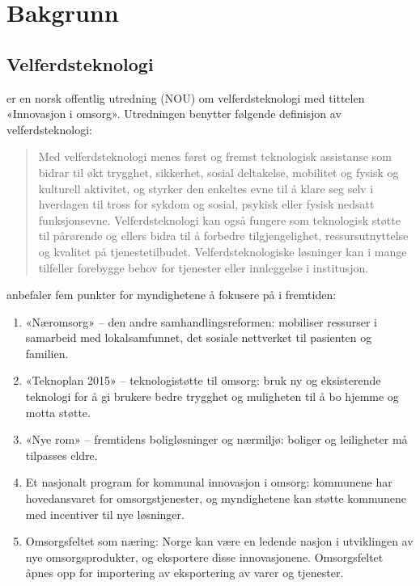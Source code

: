\chapter{Bakgrunn}
\label{ch:background}

\section{Velferdsteknologi}
\citet{regjeringen_hagen} er en norsk offentlig utredning (NOU) om velferdsteknologi med tittelen «Innovasjon i omsorg».
Utredningen benytter følgende definisjon av velferdsteknologi:

\blockquote{
Med velferdsteknologi menes først og fremst
teknologisk assistanse som bidrar til økt trygghet,
sikkerhet, sosial deltakelse, mobilitet og
fysisk og kulturell aktivitet, og styrker den
enkeltes evne til å klare seg selv i hverdagen til
tross for sykdom og sosial, psykisk eller fysisk
nedsatt funksjonsevne. Velferdsteknologi kan
også fungere som teknologisk støtte til pårørende og
ellers bidra til å forbedre tilgjengelighet,
ressursutnyttelse og kvalitet på tjenestetilbudet.
Velferdsteknologiske løsninger kan i
mange tilfeller forebygge behov for tjenester
eller innleggelse i institusjon.
}

\citet{regjeringen_hagen} anbefaler fem punkter for myndighetene å fokusere på i fremtiden:

\begin{enumerate}
    \item «Næromsorg» -- den andre samhandlingsreformen: mobiliser ressurser i samarbeid med
    lokalsamfunnet, det sosiale nettverket til pasienten og familien.
    \item «Teknoplan 2015» -- teknologistøtte til omsorg: bruk ny og eksisterende teknologi for å gi brukere
    bedre trygghet og muligheten til å bo hjemme og motta støtte.
    \item «Nye rom» -- fremtidens boligløsninger og nærmiljø: boliger og leiligheter må tilpasses eldre.
    \item Et nasjonalt program for kommunal innovasjon i omsorg: kommunene har hovedansvaret for omsorgstjenester,
    og myndighetene kan støtte kommunene med incentiver til nye løsninger.
    \item Omsorgsfeltet som næring: Norge kan være en ledende nasjon i utviklingen av nye omsorgsprodukter, og
    eksportere disse innovasjonene. Omsorgsfeltet åpnes opp for importering av eksportering av varer og tjenester.
\end{enumerate}

